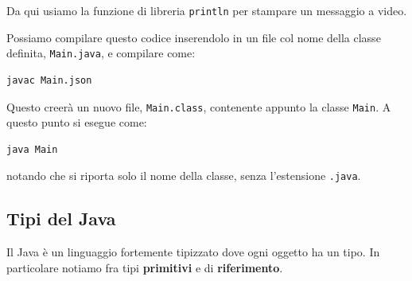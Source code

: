 \documentclass[a4paper,11pt]{article}
\begin{document}
Da qui usiamo la funzione di libreria \lstinline|println| per stampare un messaggio a video.

Possiamo compilare questo codice inserendolo in un file col nome della classe definita, \lstinline|Main.java|, e compilare come:
\begin{lstlisting}[style=shellstyle]
javac Main.json
\end{lstlisting}
Questo creerà un nuovo file, \lstinline|Main.class|, contenente appunto la classe \lstinline|Main|.
A questo punto si esegue come:
\begin{lstlisting}[style=shellstyle]
java Main
\end{lstlisting}
notando che si riporta solo il nome della classe, senza l'estensione \lstinline|.java|.

\subsection{Tipi del Java}
Il Java è un linguaggio fortemente tipizzato dove ogni oggetto ha un tipo.
In particolare notiamo fra tipi \textbf{primitivi} e di \textbf{riferimento}.

\newpage
\end{document}
